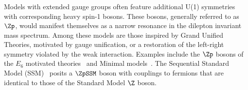 \subsubsection{}
\label{subsubsec:hr_lep}




Models with extended gauge groups often feature additional U(1) symmetries with corresponding heavy spin-1 bosons. These bosons, generally referred to as $\Zp$, would manifest themselves as a narrow resonance in the dilepton invariant mass spectrum. Among these models are those inspired by Grand Unified Theories, motivated by gauge unification, or a restoration of the left-right symmetry violated by the weak interaction. Examples include the $\Zp$ bosons of the $E_{6}$ motivated theories~\cite{London:1986jz,Joglekar:2016yap,Langacker:2008yv} and Minimal models~\cite{Salvioni:2009mt}. The Sequential Standard Model (SSM)~\cite{Langacker:2008yv} posits a $\ZpSSM$ boson with couplings to fermions that are identical to those of the Standard Model $\Z$ boson.

